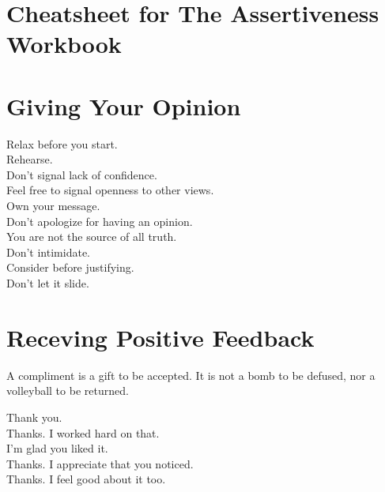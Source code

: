 \documentclass{article}
\begin{document}
\section*{Cheatsheet for The Assertiveness Workbook}

\begin{multicols}{3}

	\section*{Giving Your Opinion}

        \begin{description}
            \item[Relax before you start.]
            \item[Rehearse.]
            \item[Don't signal lack of confidence.]
            \item[Feel free to signal openness to other views.]
            \item[Own your message.]
            \item[Don't apologize for having an opinion.]
            \item[You are not the source of all truth.]
            \item[Don't intimidate.]
            \item[Consider before justifying.]
            \item[Don't let it slide.]
        \end{description}
    
	\section*{Receving Positive Feedback}

        A compliment is a gift to be accepted. It is not a bomb to be defused, nor a volleyball to be returned.

        \begin{description}
            \item[Thank you.]
            \item[Thanks. I worked hard on that.]
            \item[I'm glad you liked it.]
            \item[Thanks. I appreciate that you noticed.]
            \item[Thanks. I feel good about it too.]
        \end{description}


\end{multicols}
\end{document}
